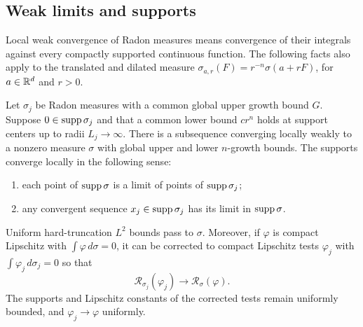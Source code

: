 \subsection{Weak limits and supports}

Local weak convergence of Radon measures means convergence of their
integrals against every compactly supported continuous function.
The following facts also apply to the translated and dilated measure
$\sigma_{a,r}(F)=r^{-n}\sigma(a+rF)$, for $a\in\mathbb R^d$ and $r>0$.

\begin{lemma}\label{lem:weak-compactness}
Let $\sigma_j$ be Radon measures with a common global upper growth
bound $G$. Suppose $0\in\operatorname{supp}\sigma_j$ and that a common lower bound
$c r^n$ holds at support centers up to radii $L_j\to\infty$.
There is a subsequence converging locally weakly to a nonzero measure
$\sigma$ with global upper and lower $n$-growth bounds.
The supports converge locally in the following sense:
\begin{enumerate}[label=(\roman*)]
\item each point of $\operatorname{supp}\sigma$ is a limit of points of
$\operatorname{supp}\sigma_j$;
\item any convergent sequence $x_j\in\operatorname{supp}\sigma_j$ has its limit
in $\operatorname{supp}\sigma$.
\end{enumerate}
Uniform hard-truncation $L^2$ bounds pass to $\sigma$. Moreover,
if $\varphi$ is compact Lipschitz with $\int\varphi\,d\sigma=0$,
it can be corrected to compact Lipschitz tests $\varphi_j$ with
$\int\varphi_j\,d\sigma_j=0$ so that
\[
 \mathcal R_{\sigma_j}(\varphi_j)\longrightarrow
 \mathcal R_\sigma(\varphi).
\]
The supports and Lipschitz constants of the corrected tests remain
uniformly bounded, and $\varphi_j\to\varphi$ uniformly.
\end{lemma}

